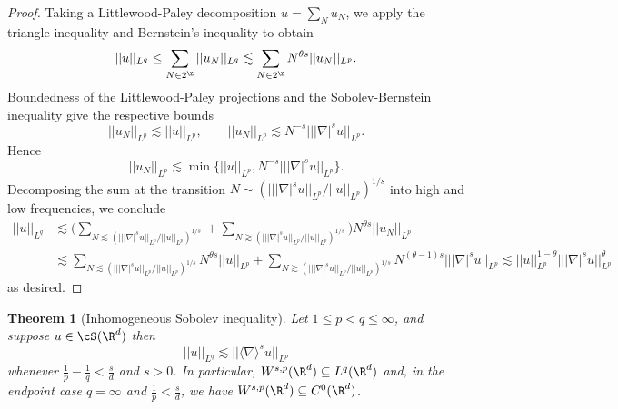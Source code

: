 \documentclass[reqno]{amsart}
\newtheorem{theorem}{Theorem}
\theoremstyle{definition}
\theoremstyle{remark}
\begin{document}
\begin{proof}
	Taking a Littlewood-Paley decomposition $u = \sum_N u_N$, we apply the triangle inequality and Bernstein's inequality to obtain
	\begin{align*}
		||u||_{L^q}
			\leq \sum_{N \in 2^\Z} ||u_N||_{L^q} \lesssim \sum_{N \in 2^\Z} N^{\theta s} ||u_N||_{L^p}.
	\end{align*}
	Boundedness of the Littlewood-Paley projections and the Sobolev-Bernstein inequality give the respective bounds
		\[ ||u_N||_{L^p} \lesssim ||u||_{L^p}, \qquad ||u_N||_{L^p} \lesssim N^{-s} || |\nabla|^s u||_{L^p}.\]
	Hence
		\[ ||u_N||_{L^p} \lesssim \min \Big\{ ||u||_{L^p}, N^{-s} || |\nabla|^s u||_{L^p} \Big\}. \]
	Decomposing the sum at the transition $N \sim (|||\nabla|^s u||_{L^p}/||u||_{L^p})^{1/s}$ into high and low frequencies, we conclude
		\begin{align*}
			||u||_{L^q}
				&\lesssim \Big( \sum_{N \lesssim (|||\nabla|^s u||_{L^p}/||u||_{L^p})^{1/s}} + \sum_{N \gtrsim (|||\nabla|^s u||_{L^p}/||u||_{L^p})^{1/s}} \Big) N^{\theta s} ||u_N||_{L^p} \\
				&\lesssim \sum_{N \lesssim (|||\nabla|^s u||_{L^p}/||u||_{L^p})^{1/s}} N^{\theta s} ||u||_{L^p} + \sum_{N \gtrsim (|||\nabla|^s u||_{L^p}/||u||_{L^p})^{1/s}} N^{(\theta - 1) s}  |||\nabla|^s u||_{L^p} \lesssim ||u||_{L^p}^{1 - \theta} || |\nabla|^s u||_{L^p}^\theta 
		\end{align*}	
	as desired. 	
\end{proof}

\begin{theorem}[Inhomogeneous Sobolev inequality]
	Let $1 \leq p < q \leq \infty$, and suppose $u \in \cS (\R^d)$ then 
		\[ ||u||_{L^q} \lesssim || \langle \nabla \rangle^s u ||_{L^p} \]
	whenever $\tfrac1p - \tfrac1q < \tfrac{s}{d}$ and $s > 0$. In particular, $W^{s, p} (\R^d) \subseteq L^q (\R^d)$ and, in the endpoint case $q = \infty$ and $\tfrac1p < \tfrac{s}{d}$, we have $W^{s, p} (\R^d) \subseteq C^0 (\R^d)$. 
\end{theorem}
\end{document}
